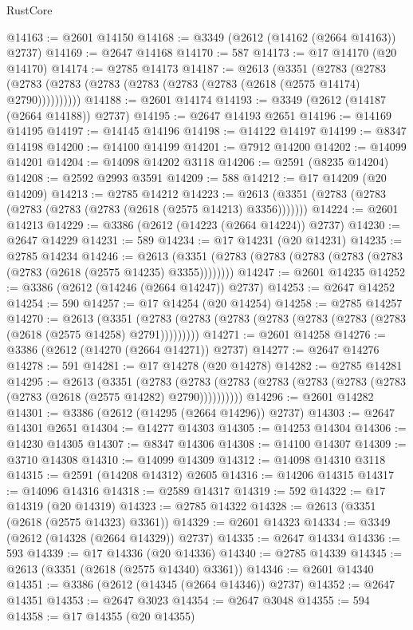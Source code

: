 \begin{lexlean}{RustCore}
\begin{coremodule}
@14163 := @2601 @14150
@14168 := @3349 (@2612 (@14162 (@2664 @14163)) @2737)
@14169 := @2647 @14168
@14170 := 587
@14173 := @17 @14170 (@20 @14170)
@14174 := @2785 @14173
@14187 := @2613
    (@3351
      (@2783 (@2783 (@2783 (@2783 (@2783 (@2783 (@2783 (@2783 (@2618 (@2575 @14174) @2790))))))))))
@14188 := @2601 @14174
@14193 := @3349 (@2612 (@14187 (@2664 @14188)) @2737)
@14195 := @2647 @14193 @2651
@14196 := @14169 @14195
@14197 := @14145 @14196
@14198 := @14122 @14197
@14199 := @8347 @14198
@14200 := @14100 @14199
@14201 := @7912 @14200
@14202 := @14099 @14201
@14204 := @14098 @14202 @3118
@14206 := @2591 (@8235 @14204)
@14208 := @2592 @2993 @3591
@14209 := 588
@14212 := @17 @14209 (@20 @14209)
@14213 := @2785 @14212
@14223 := @2613 (@3351 (@2783 (@2783 (@2783 (@2783 (@2783 (@2618 (@2575 @14213) @3356)))))))
@14224 := @2601 @14213
@14229 := @3386 (@2612 (@14223 (@2664 @14224)) @2737)
@14230 := @2647 @14229
@14231 := 589
@14234 := @17 @14231 (@20 @14231)
@14235 := @2785 @14234
@14246 := @2613 (@3351 (@2783 (@2783 (@2783 (@2783 (@2783 (@2783 (@2618 (@2575 @14235) @3355))))))))
@14247 := @2601 @14235
@14252 := @3386 (@2612 (@14246 (@2664 @14247)) @2737)
@14253 := @2647 @14252
@14254 := 590
@14257 := @17 @14254 (@20 @14254)
@14258 := @2785 @14257
@14270 := @2613
    (@3351 (@2783 (@2783 (@2783 (@2783 (@2783 (@2783 (@2783 (@2618 (@2575 @14258) @2791)))))))))
@14271 := @2601 @14258
@14276 := @3386 (@2612 (@14270 (@2664 @14271)) @2737)
@14277 := @2647 @14276
@14278 := 591
@14281 := @17 @14278 (@20 @14278)
@14282 := @2785 @14281
@14295 := @2613
    (@3351
      (@2783 (@2783 (@2783 (@2783 (@2783 (@2783 (@2783 (@2783 (@2618 (@2575 @14282) @2790))))))))))
@14296 := @2601 @14282
@14301 := @3386 (@2612 (@14295 (@2664 @14296)) @2737)
@14303 := @2647 @14301 @2651
@14304 := @14277 @14303
@14305 := @14253 @14304
@14306 := @14230 @14305
@14307 := @8347 @14306
@14308 := @14100 @14307
@14309 := @3710 @14308
@14310 := @14099 @14309
@14312 := @14098 @14310 @3118
@14315 := @2591 (@14208 @14312) @2605
@14316 := @14206 @14315
@14317 := @14096 @14316
@14318 := @2589 @14317
@14319 := 592
@14322 := @17 @14319 (@20 @14319)
@14323 := @2785 @14322
@14328 := @2613 (@3351 (@2618 (@2575 @14323) @3361))
@14329 := @2601 @14323
@14334 := @3349 (@2612 (@14328 (@2664 @14329)) @2737)
@14335 := @2647 @14334
@14336 := 593
@14339 := @17 @14336 (@20 @14336)
@14340 := @2785 @14339
@14345 := @2613 (@3351 (@2618 (@2575 @14340) @3361))
@14346 := @2601 @14340
@14351 := @3386 (@2612 (@14345 (@2664 @14346)) @2737)
@14352 := @2647 @14351
@14353 := @2647 @3023
@14354 := @2647 @3048
@14355 := 594
@14358 := @17 @14355 (@20 @14355)

\end{coremodule}
\end{lexlean}
